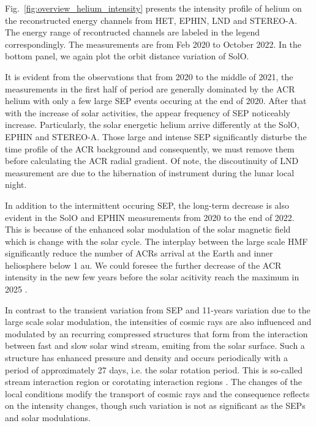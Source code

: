 Fig.~\ref{fig:overview_helium_intensity} presents the intensity profile of helium on the reconstructed energy channels from \ac{HET}, \ac{EPHIN}, \ac{LND} and \ac{STEREO}-A. The energy range of recontructed channels are labeled in the legend correspondingly. The measurements are from Feb 2020 to October 2022. In the bottom panel, we again plot the orbit distance variation of \ac{SolO}.

It is evident from the observations that from 2020 to the middle of 2021, the measurements in the first half of period are generally dominated by the \ac{ACR} helium with only a few large \ac{SEP} events occuring at the end of 2020. After that with the increase of solar activities, the appear frequency of \ac{SEP} noticeably increase. Particularly, the solar energetic helium arrive differently at the \ac{SolO}, \ac{EPHIN} and \ac{STEREO}-A.
Those large and intense \ac{SEP} significantly disturbe the time profile of the \ac{ACR} background and consequently, we must remove them before calculating the \ac{ACR} radial gradient. Of note, the discoutinuity of \ac{LND} measurement are due to the hibernation of instrument during the lunar local night.

In addition to the intermittent occuring \ac{SEP}, the long-term decrease is also evident in the \ac{SolO} and \ac{EPHIN} measurements from 2020 to the end of 2022. This is because of the enhanced solar modulation of the solar magnetic field which is change with the solar cycle. The interplay between the large scale \ac{HMF} significantly reduce the number of \acp{ACR} arrival at the Earth and inner heliosphere below 1 au. We could foresee the further decrease of the \ac{ACR} intensity in the new few years before the solar acitivity reach the maximum in 2025 \citep{}.

In contrast to the transient variation from \ac{SEP} and 11-years variation due to the large scale solar modulation, the intensities of cosmic rays are also influenced and modulated by an recurring compressed structures that form from the interaction between fast and slow solar wind stream, emiting from the solar surface. Such a structure has enhanced pressure and density and occurs periodically with a period of approximately 27 days, i.e. the solar rotation period. This is so-called stream interaction region or corotating interaction regions \citep{Burlaga9174, Gosling1976, Schwenn1990, Richardson2004}. The changes of the local conditions modify the transport of cosmic rays and the consequence reflects on the intensity changes, though such variation is not as significant as the \acp{SEP} and solar modulations.


